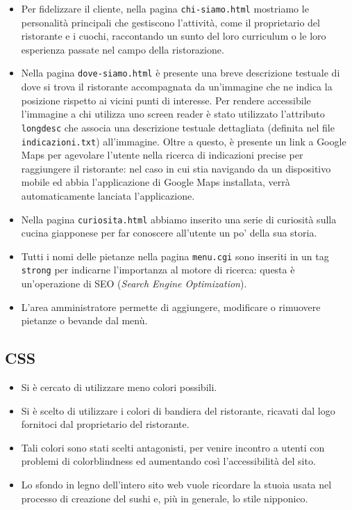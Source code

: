 \documentclass[../relazione.tex]{subfiles}
\begin{document}
\begin{itemize}
		\item Per fidelizzare il cliente, nella pagina \texttt{chi-siamo.html} mostriamo le personalità principali che gestiscono l'attività, come il proprietario del ristorante e i cuochi, raccontando un sunto del loro curriculum o le loro esperienza passate nel campo della ristorazione.
		\item Nella pagina \texttt{dove-siamo.html} è presente una breve descrizione testuale di dove si trova il ristorante accompagnata da un'immagine che ne indica la posizione rispetto ai vicini punti di interesse. Per rendere accessibile l'immagine a chi utilizza uno screen reader è stato utilizzato l'attributo \texttt{longdesc} che associa una descrizione testuale dettagliata (definita nel file \texttt{indicazioni.txt}) all'immagine. Oltre a questo, è presente un link a Google Maps per agevolare l'utente nella ricerca di indicazioni precise per raggiungere il ristorante: nel caso in cui stia navigando da un dispositivo mobile ed abbia l'applicazione di Google Maps installata, verrà automaticamente lanciata l'applicazione.
		\item Nella pagina \texttt{curiosita.html} abbiamo inserito una serie di curiosità sulla cucina giapponese per far conoscere all'utente un po' della sua storia.
		\item Tutti i nomi delle pietanze nella pagina \texttt{menu.cgi} sono inseriti in un tag \texttt{strong} per indicarne l'importanza al motore di ricerca: questa è un'operazione di SEO (\textit{Search Engine Optimization}).
		\item L'area amministratore permette di aggiungere, modificare o rimuovere pietanze o bevande dal menù.
	\end{itemize}
	\subsection{CSS}
	\begin{itemize}
		\item Si è cercato di utilizzare meno colori possibili.
		\item Si è scelto di utilizzare i colori di bandiera del ristorante, ricavati dal logo fornitoci dal proprietario del ristorante.
		\item Tali colori sono stati scelti antagonisti, per venire incontro a utenti con problemi di colorblindness ed aumentando così l'accessibilità del sito.
		\item Lo sfondo in legno dell'intero sito web vuole ricordare la stuoia usata nel processo di creazione del sushi e, più in generale, lo stile nipponico.
	\end{itemize}
\end{document}
